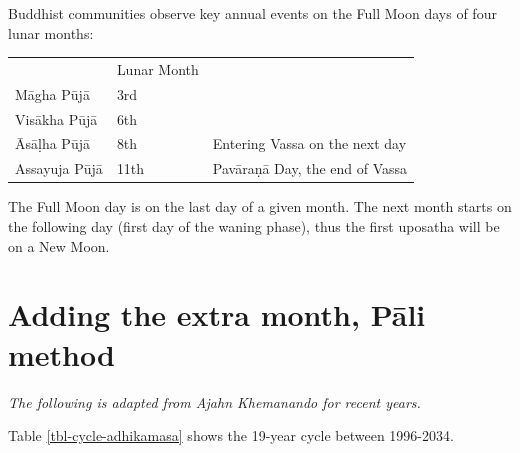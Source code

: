 \documentclass[11pt,oneside]{memoir-article}
\begin{document}
Buddhist communities observe key annual events on the Full Moon
days of four lunar months:

\begin{center}
\begin{tabular}{lll}
 & Lunar Month & \\
Māgha Pūjā & 3rd & \\
Visākha Pūjā & 6th & \\
Āsāḷha Pūjā & 8th & Entering Vassa on the next day\\
Assayuja Pūjā & 11th & Pavāraṇā Day, the end of Vassa\\
\end{tabular}
\end{center}

The Full Moon day is on the last day of a given month. The next month
starts on the following day (first day of the waning phase), thus the
first uposatha will be on a New Moon.

\chapter{Adding the extra month, Pāli method}
\label{sec-2}
\label{pali-method}

\emph{The following is adapted from Ajahn Khemanando for recent
years.}\cite{khemanando-adhikamasa}

Table \ref{tbl-cycle-adhikamasa} shows the 19-year cycle between
1996-2034.
\end{document}
